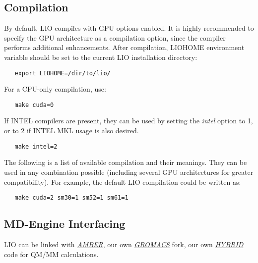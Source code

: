 \subsection{Compilation}

By default, LIO compiles with GPU options enabled. It is highly recommended to specify
the GPU architecture as a compilation option, since the compiler performs additional
enhancements. After compilation, \textcolor{lioteal}{LIOHOME} environment variable 
should be set to the current LIO installation directory:

\begin{lstlisting}
   export LIOHOME=/dir/to/lio/
\end{lstlisting}

For a CPU-only compilation, use:

\begin{lstlisting}
   make cuda=0
\end{lstlisting}

If INTEL compilers are present, they can be used by setting the \textit{intel}
option to 1, or to 2 if INTEL MKL usage is also desired. 

\begin{lstlisting}
   make intel=2
\end{lstlisting}

The following is a list of available compilation and their meanings. They can be
used in any combination possible (including several GPU architectures for greater
compatibility). For example, the default LIO compilation could be written as:

\begin{lstlisting}
   make cuda=2 sm30=1 sm52=1 sm61=1
\end{lstlisting}



\subsection{MD-Engine Interfacing}
LIO can be linked with  \textit{\href{http://ambermd.org/index.php}{AMBER}},
our own \textit{\href{https://github.com/MALBECC/gromacs}{GROMACS}} fork, 
our own \textit{\href{https://github.com/MALBECC/hybrid}{HYBRID}} code for 
QM/MM calculations.

